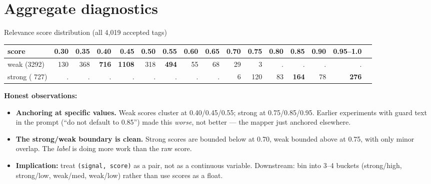 \documentclass[10pt,aspectratio=169]{beamer}
\begin{document}
\section{Aggregate diagnostics}

\begin{frame}{Relevance score distribution (all 4{,}019 accepted tags)}
  \scriptsize
  \centering
  \setlength{\tabcolsep}{4pt}
  \renewcommand{\arraystretch}{1.1}
  \begin{tabular}{lrrrrrrrrrrrrrrr}
    \toprule
    \textbf{score} & 0.30 & 0.35 & 0.40 & 0.45 & 0.50 & 0.55 & 0.60 & 0.65 & 0.70 & 0.75 & 0.80 & 0.85 & 0.90 & 0.95--1.0 \\
    \midrule
    weak   (3292) & 130 & 368 & \textbf{716} & \textbf{1108} & 318 & \textbf{494} &  55 &  68 &  29 &   3 &   . &   . &   . &   . \\
    strong ( 727) &   . &   . &   . &   . &   . &   . &   . &   . &   6 & 120 &  83 & \textbf{164} &  78 & \textbf{276} \\
    \bottomrule
  \end{tabular}

  \vspace{0.5em}
  \raggedright
  \textbf{Honest observations:}
  \begin{itemize}\itemsep0.15em
    \item \textbf{Anchoring at specific values.} Weak scores cluster at 0.40/0.45/0.55; strong at
          0.75/0.85/0.95. Earlier experiments with guard text in the prompt (``do not default
          to 0.85'') made this \emph{worse}, not better --- the mapper just anchored elsewhere.
    \item \textbf{The strong/weak boundary is clean.} Strong scores are bounded below at 0.70,
          weak bounded above at 0.75, with only minor overlap. The \emph{label} is doing more
          work than the raw score.
    \item \textbf{Implication:} treat \texttt{(signal, score)} as a pair, not as a continuous
          variable. Downstream: bin into 3--4 buckets (strong/high, strong/low, weak/med,
          weak/low) rather than use scores as a float.
  \end{itemize}
\end{frame}
\end{document}

